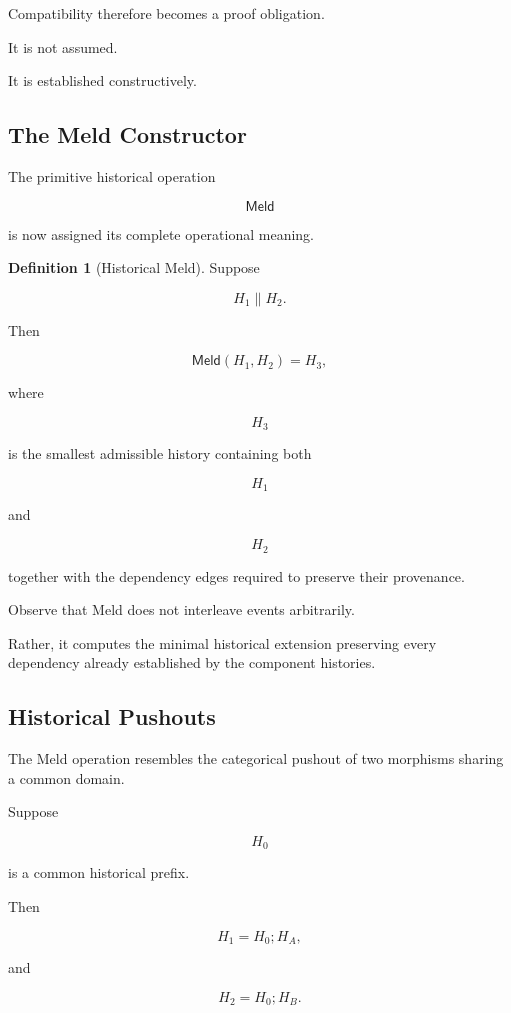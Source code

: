 \documentclass[12pt,oneside]{article}
\theoremstyle{definition}
\newtheorem{definition}[theorem]{Definition}
\theoremstyle{remark}
\newcommand{\Meld}{\mathsf{Meld}}
\begin{document}
Compatibility therefore becomes a proof obligation.

It is not assumed.

It is established constructively.

\subsection{The Meld Constructor}

The primitive historical operation

\[
\Meld
\]

is now assigned its complete operational meaning.

\begin{definition}[Historical Meld]

Suppose

\[
H_1
\parallel
H_2.
\]

Then

\[
\Meld(H_1,H_2)
=
H_3,
\]

where

\[
H_3
\]

is the smallest admissible history containing both

\[
H_1
\]

and

\[
H_2
\]

together with the dependency edges required to preserve their provenance.

\end{definition}

Observe that Meld does not interleave events arbitrarily.

Rather, it computes the minimal historical extension preserving every dependency
already established by the component histories.

\subsection{Historical Pushouts}

The Meld operation resembles the categorical pushout of two morphisms sharing a
common domain.

Suppose

\[
H_0
\]

is a common historical prefix.

Then

\[
H_1
=
H_0;
H_A,
\]

and

\[
H_2
=
H_0;
H_B.
\]
\end{document}
